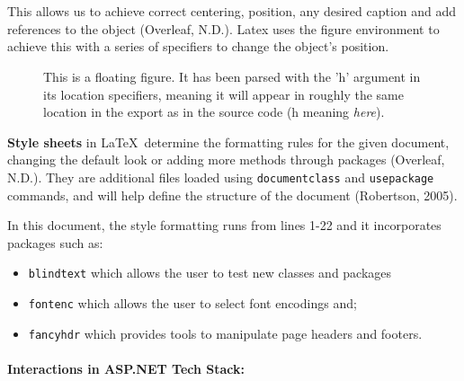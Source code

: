 \documentclass[a4paper, 11pt]{report}
\begin{document}
	\\
	\\This allows us to achieve correct centering, position, any desired caption and add references to the object (Overleaf, N.D.).
	Latex uses the figure environment to achieve this with a series of specifiers to change the object's position.
    \\
    \begin{figure}[h]
        \centering
        This is a floating figure. It has been parsed with the 'h' argument in its location specifiers, meaning it will appear in roughly the same location in the export as in the source code (h meaning \textit{here}).
    \end{figure}

    \textbf{Style sheets} in \LaTeX\ determine the formatting rules for the given document, changing the default look or adding more methods through packages (Overleaf, N.D.). They are additional files loaded using \texttt{documentclass{}} and \texttt{usepackage{}} commands, and will help define the structure of the document (Robertson, 2005).

    In this document, the style formatting runs from lines 1-22 and it incorporates packages such as:

    \begin{itemize}
        \item \texttt{blindtext} which allows the user to test new classes and packages
        \item \texttt{fontenc} which allows the user to select font encodings and;
        \item \texttt{fancyhdr} which provides tools to manipulate page headers and footers.
    \end{itemize}


    \paragraph{Interactions in ASP.NET Tech Stack:}
\end{document}
